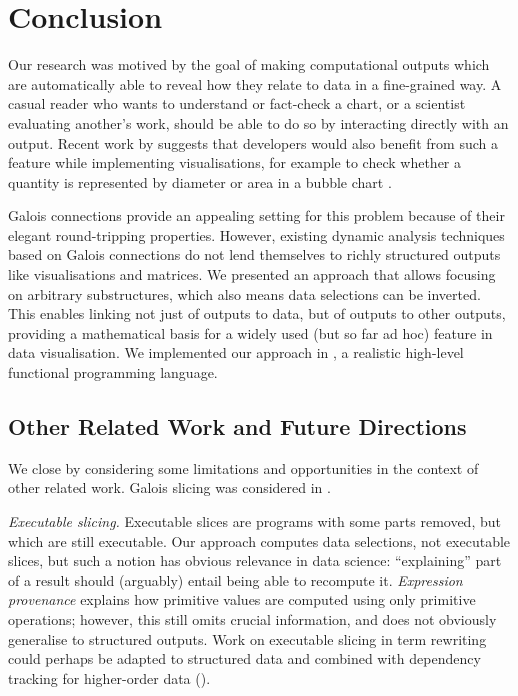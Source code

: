 \section{Conclusion}
\label{sec:conclusion}

Our research was motived by the goal of making computational outputs which are automatically able to reveal how they relate to data in a fine-grained way. A casual reader who wants to understand or fact-check a chart, or a scientist evaluating another's work, should be able to do so by interacting directly with an output. Recent work by \citeauthor{walny19} suggests that developers would also benefit from such a feature while implementing visualisations, for example to check whether a quantity is represented by diameter or area in a bubble chart \cite{walny19}.

Galois connections provide an appealing setting for this problem because of their elegant round-tripping properties. However,  existing dynamic analysis techniques based on Galois connections do not lend themselves to richly structured outputs like visualisations and matrices. We presented an approach that allows focusing on arbitrary substructures, which also means data selections can be inverted. This enables linking not just of outputs to data, but of outputs to other outputs, providing a mathematical basis for a widely used (but so far ad hoc) feature in data visualisation. We implemented our approach in \href{https://github.com/explorable-viz/fluid}{\OurLanguage}, a realistic high-level functional programming language.

\subsection{Other Related Work and Future Directions}
\label{sec:conclusion:other-related-work}

We close by considering some limitations and opportunities in the context of other related work. Galois slicing \cite{perera12a,ricciotti17,perera16d} was considered in .

\emph{Executable slicing.} Executable slices \cite{hall95} are programs with some parts removed, but which are still executable. Our approach computes data selections, not executable slices, but such a notion has obvious relevance in data science: ``explaining'' part of a result should (arguably) entail being able to recompute it. \emph{Expression provenance} \cite{acar12} explains how primitive values are computed using only primitive operations; however, this still omits crucial information, and does not obviously generalise to structured outputs. Work on executable slicing in term rewriting \cite{field98} could perhaps be adapted to structured data and combined with dependency tracking for higher-order data ().

